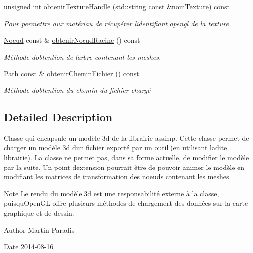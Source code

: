 \begin{DoxyCompactItemize}
unsigned int \hyperlink{classmodele_1_1_modele3_d_a12d8fa87d7b2087866ea81af511041f4}{obtenir\+Texture\+Handle} (std\+::string const \&nom\+Texture) const 
\begin{DoxyCompactList}\small\item\em Pour permettre aux matériau de récupérer l\textquotesingle{}identifiant opengl de la texture. \end{DoxyCompactList}\item 
\hyperlink{classmodele_1_1_noeud}{Noeud} const \& \hyperlink{classmodele_1_1_modele3_d_af4d5e0bd8b91af3195086dda8fe019e3}{obtenir\+Noeud\+Racine} () const 
\begin{DoxyCompactList}\small\item\em Méthode d\textquotesingle{}obtention de l\textquotesingle{}arbre contenant les meshes. \end{DoxyCompactList}\item 
Path const \& \hyperlink{classmodele_1_1_modele3_d_ad175907ab5ce7898958ad42008db7869}{obtenir\+Chemin\+Fichier} () const 
\begin{DoxyCompactList}\small\item\em Méthode d\textquotesingle{}obtention du chemin du fichier chargé \end{DoxyCompactList}\end{DoxyCompactItemize}


\subsection{Detailed Description}
Classe qui encapsule un modèle 3d de la librairie \textquotesingle{}assimp\textquotesingle{}. Cette classe permet de charger un modèle 3d d\textquotesingle{}un fichier exporté par un outil (en utilisant ladite librairie). La classe ne permet pas, dans sa forme actuelle, de modifier le modèle par la suite. Un point d\textquotesingle{}extension pourrait être de pouvoir animer le modèle en modifiant les matrices de transformation des noeuds contenant les meshes. 

\begin{DoxyNote}{Note}
Le rendu du modèle 3d est une responsabilité externe à la classe, puisqu\textquotesingle{}Open\+G\+L offre plusieurs méthodes de chargement des données sur la carte graphique et de dessin.
\end{DoxyNote}
\begin{DoxyAuthor}{Author}
Martin Paradis 
\end{DoxyAuthor}
\begin{DoxyDate}{Date}
2014-\/08-\/16 
\end{DoxyDate}



